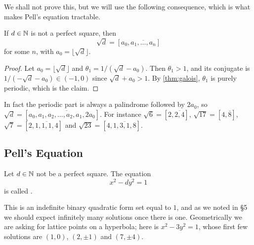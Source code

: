 \documentclass[a4paper]{scrartcl}
\begin{document}
We shall not prove this, but we will use the following consequence, which is what makes Pell's equation tractable.

\begin{corollary}\label{cor:sqrtd}
	If $d \in \mathbb{N}$ is not a perfect square, then
	$$
	\sqrt d = [a_0, \overline{a_1, \dots, a_n}]
	$$
	for some $n$, with $a_0 = \lfloor\sqrt d\rfloor$.
\end{corollary}
\begin{proof}
	Let $a_0 = \lfloor\sqrt d\rfloor$ and $\theta_1 = 1/(\sqrt d - a_0)$. Then $\theta_1 > 1$, and its conjugate is $1/(-\sqrt d - a_0) \in (-1, 0)$ since $\sqrt d + a_0 > 1$. By \autoref{thm:galois}, $\theta_1$ is purely periodic, which is the claim.
\end{proof}

\begin{remark}
	In fact the periodic part is always a palindrome followed by $2a_0$, so $\sqrt d = [a_0, \overline{a_1, a_2, \dots, a_2, a_1, 2a_0}]$. For instance $\sqrt6 = [2,\overline{2,4}]$, $\sqrt{17} = [4, \overline 8]$, $\sqrt7 = [2, \overline{1,1,1,4}]$ and $\sqrt{23} = [4, \overline{1,3,1,8}]$.
\end{remark}

\subsection{Pell's Equation}

\begin{definition}
	Let $d \in \mathbb{N}$ not be a perfect square. The equation
	$$
	x^2 - dy^2 = 1
	$$
	is called .
\end{definition}

This is an indefinite binary quadratic form set equal to $1$, and as we noted in \S5 we should expect infinitely many solutions once there is one. Geometrically we are asking for lattice points on a hyperbola; here is $x^2 - 3y^2 = 1$, whose first few solutions are $(1,0)$, $(2, \pm1)$ and $(7, \pm4)$.

\begin{center}
\end{center}
\end{document}

